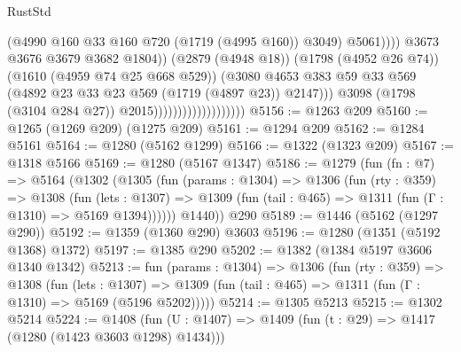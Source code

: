 \begin{lexlean}{RustStd}
\begin{coremodule}
{\begin{coremodule}
{{{{{{{{{{{{                                                        (@4990
                                                          @160
                                                          @33
                                                          @160
                                                          @720
                                                          (@1719 (@4995 @160))
                                                          @3049)
                                                        @5061))))
                                                @3673
                                                @3676
                                                @3679
                                                @3682
                                                @1804))
                                            (@2879 (@4948 @18))
                                            (@1798 (@4952 @26 @74))
                                            (@1610 (@4959 @74 @25 @668 @529))
                                            (@3080
                                              @4653
                                              @383
                                              @59
                                              @33
                                              @569
                                              (@4892 @23 @33 @23 @569 (@1719 (@4897 @23)) @2147)))
                                          @3098
                                          (@1798 (@3104 @284 @27))
                                          @2015)))))))))))))))))))
@5156 := @1263 @209
@5160 := @1265 (@1269 @209) (@1275 @209)
@5161 := @1294 @209
@5162 := @1284 @5161
@5164 := @1280 (@5162 @1299)
@5166 := @1322 (@1323 @209)
@5167 := @1318 @5166
@5169 := @1280 (@5167 @1347)
@5186 := @1279
    (fun (fn : @7) =>
    @5164
      (@1302
        (@1305
          (fun (params : @1304) =>
          @1306
            (fun (rty : @359) =>
            @1308
              (fun (lets : @1307) =>
              @1309 (fun (tail : @465) => @1311 (fun (Γ : @1310) => @5169 @1394))))))
        @1440))
    @290
@5189 := @1446 (@5162 (@1297 @290))
@5192 := @1359 (@1360 @290) @3603
@5196 := @1280 (@1351 (@5192 @1368) @1372)
@5197 := @1385 @290
@5202 := @1382 (@1384 @5197 @3606 @1340 @1342)
@5213 := fun (params : @1304) =>
  @1306
    (fun (rty : @359) =>
    @1308
      (fun (lets : @1307) =>
      @1309 (fun (tail : @465) => @1311 (fun (Γ : @1310) => @5169 (@5196 @5202)))))
@5214 := @1305 @5213
@5215 := @1302 @5214
@5224 := @1408 (fun (U : @1407) => @1409 (fun (t : @29) => @1417 (@1280 (@1423 @3603 @1298) @1434)))
}}}}}}}}}}}}
\end{coremodule}}
\end{coremodule}
\end{lexlean}
